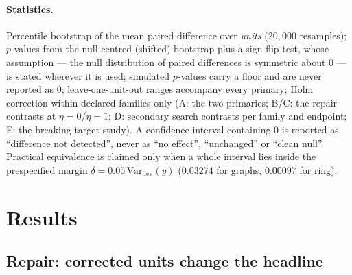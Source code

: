 \documentclass{neurips_2024}
\newcommand{\dev}{\mathrm{dev}}
\begin{document}
\paragraph{Statistics.} Percentile bootstrap of the mean paired difference over
\emph{units} ($20{,}000$ resamples); $p$-values from the null-centred (shifted) bootstrap
plus a sign-flip test, whose assumption --- the null distribution of paired differences is
symmetric about $0$ --- is stated wherever it is used; simulated $p$-values carry a floor
and are never reported as $0$; leave-one-unit-out ranges accompany every primary; Holm
correction within declared families only (A: the two primaries; B/C: the repair contrasts
at $\eta{=}0$/$\eta{=}1$; D: secondary search contrasts per family and endpoint; E: the
breaking-target study). A confidence interval containing $0$ is reported as ``difference
not detected'', never as ``no effect'', ``unchanged'' or ``clean null''. Practical
equivalence is claimed only when a whole interval lies inside the prespecified margin
$\delta=0.05\,\mathrm{Var}_{\dev}(y)$ ($0.03274$ for graphs, $0.00097$ for ring).

\section{Results}

\subsection{Repair: corrected units change the headline}
\label{sec:repair-results}
\end{document}
